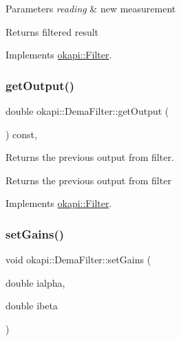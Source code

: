 \begin{DoxyParams}{Parameters}
{\em reading} & new measurement \\
\hline
\end{DoxyParams}
\begin{DoxyReturn}{Returns}
filtered result 
\end{DoxyReturn}


Implements \mbox{\hyperlink{classokapi_1_1Filter_a7c2ea0b64b37b688900189856d58da15}{okapi\+::\+Filter}}.

\mbox{\label{classokapi_1_1DemaFilter_a2dba33231bb71e16d13adbcefefed425}} 
\subsubsection{\texorpdfstring{getOutput()}{getOutput()}}
{\footnotesize\ttfamily double okapi\+::\+Dema\+Filter\+::get\+Output (\begin{DoxyParamCaption}{ }\end{DoxyParamCaption}) const\hspace{0.3cm}{\ttfamily [override]}, {\ttfamily [virtual]}}

Returns the previous output from filter.

\begin{DoxyReturn}{Returns}
the previous output from filter 
\end{DoxyReturn}


Implements \mbox{\hyperlink{classokapi_1_1Filter_a3469cd4bc108f8accf300d9f5cc9f42f}{okapi\+::\+Filter}}.

\mbox{\label{classokapi_1_1DemaFilter_a714fcbd4a8792adfae65fea048cedd98}} 
\subsubsection{\texorpdfstring{setGains()}{setGains()}}
{\footnotesize\ttfamily void okapi\+::\+Dema\+Filter\+::set\+Gains (\begin{DoxyParamCaption}\item[{double}]{ialpha,  }\item[{double}]{ibeta }\end{DoxyParamCaption})\hspace{0.3cm}{\ttfamily [virtual]}}

